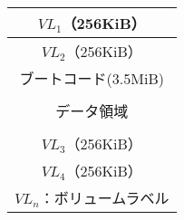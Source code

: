 \documentclass[border=1mm]{standalone}
\begin{document}
\begin{tabular}{|c|}
  \hline
  $VL_1$（256KiB） \\\hline
  $VL_2$（256KiB） \\\hline
  ブートコード(3.5MiB) \\\hline
                   \\
  データ領域       \\
                   \\\hline
  $VL_3$（256KiB） \\\hline
  $VL_4$（256KiB） \\\hline
  \multicolumn{1}{c}{$VL_n$：ボリュームラベル}
\end{tabular}
\end{document}
